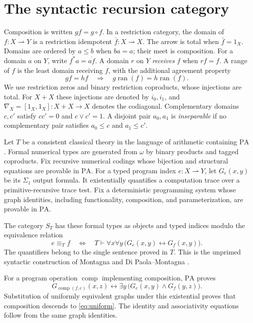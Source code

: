 \documentclass[11pt]{article}
\newcommand{\PA}{\mathrm{PA}}
\newcommand{\ran}{\operatorname{ran}}
\begin{document}
\section{The syntactic recursion category}\label{sec:syntactic}

Composition is written $gf=g\circ f$. In a restriction category, the
domain of $f:X\rightharpoonup Y$ is a restriction idempotent
$\bar f:X\rightharpoonup X$. The arrow is total when $\bar f=1_X$.
Domains are ordered by $a\le b$ when $ba=a$; their meet is composition.
For a domain $a$ on $Y$, write $f^*a=\overline{af}$. A domain $r$ on
$Y$ \emph{receives} $f$ when $rf=f$. A range of $f$
is the least domain receiving $f$, with the additional agreement property
\[
 gf=hf\quad\Longrightarrow\quad
 g\ran(f)=h\ran(f).
\]
We use restriction zeros and binary restriction coproducts, whose injections
are total. For $X+X$ these injections are denoted by $i_0,i_1$, and
$\nabla_X=[1_X,1_X]:X+X\to X$ denotes the codiagonal.
Complementary domains $c,c'$ satisfy $cc'=0$ and $c\vee c'=1$.
A disjoint pair $a_0,a_1$ is \emph{inseparable} if no complementary pair
satisfies $a_0\le c$ and $a_1\le c'$.

Let $T$ be a consistent classical theory in the language of arithmetic
containing $\PA$. Formal numerical types are generated from $\omega$ by
binary products and tagged coproducts. Fix recursive numerical codings
whose bijection and structural equations are provable in $\PA$.
For a typed program index $e:X\rightharpoonup Y$, let $G_e(x,y)$ be its
$\Sigma_1$ output formula. It existentially quantifies a computation trace
over a primitive-recursive trace test. Fix a deterministic programming
system whose graph identities, including functionality, composition,
and parameterization, are provable in $\PA$.

The category $S_T$ has these formal types as objects and typed indices
modulo the equivalence relation
\begin{equation}\label{eq:uniform}
 e\equiv_T f
 \quad\Longleftrightarrow\quad
 T\vdash \forall x\forall y\,
       \bigl(G_e(x,y)\leftrightarrow G_f(x,y)\bigr).
\end{equation}
The quantifiers belong to the single sentence proved in $T$.
This is the unprimed syntactic construction of Montagna and
Di Paola--Montagna \cite{Montagna,DPM}.

For a program operation $\operatorname{comp}$ implementing composition,
$\PA$ proves
\begin{equation}\label{eq:composition}
 G_{\operatorname{comp}(f,e)}(x,z)
 \leftrightarrow
 \exists y\,\bigl(G_e(x,y)\land G_f(y,z)\bigr).
\end{equation}
Substitution of uniformly equivalent graphs under this existential proves
that composition descends to \eqref{eq:uniform}. The identity and
associativity equations follow from the same graph identities.
\end{document}
